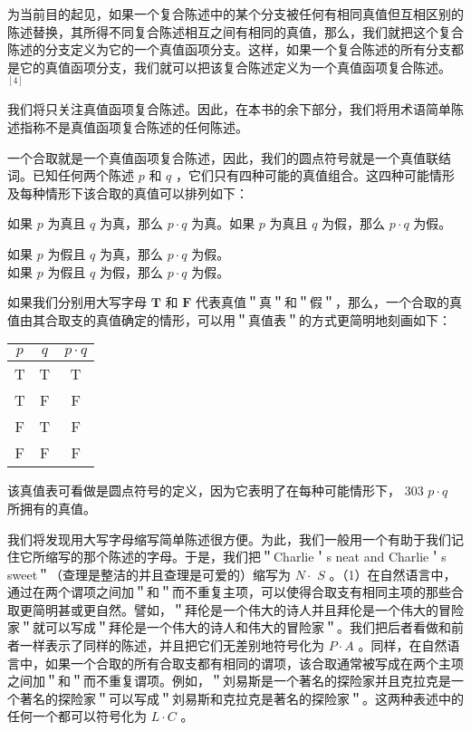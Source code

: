 为当前目的起见，如果一个复合陈述中的某个分支被任何有相同真值但互相区别的陈述替换，其所得不同复合陈述相互之间有相同的真值，那么，我们就把这个复合陈述的分支定义为它的一个真值函项分支。这样，如果一个复合陈述的所有分支都是它的真值函项分支，我们就可以把该复合陈述定义为一个真值函项复合陈述。 ${ }^{[4]}$

我们将只关注真值函项复合陈述。因此，在本书的余下部分，我们将用术语简单陈述指称不是真值函项复合陈述的任何陈述。

一个合取就是一个真值函项复合陈述，因此，我们的圆点符号就是一个真值联结词。已知任何两个陈述 $p$ 和 $q$ ，它们只有四种可能的真值组合。这四种可能情形及每种情形下该合取的真值可以排列如下：

如果 $p$ 为真且 $q$ 为真，那么 $p \cdot q$ 为真。如果 $p$ 为真且 $q$ 为假，那么 $p \cdot q$ 为假。

如果 $p$ 为假且 $q$ 为真，那么 $p \cdot q$ 为假。\\
如果 $p$ 为假且 $q$ 为假，那么 $p \cdot q$ 为假。

如果我们分别用大写字母 $\mathbf{T}$ 和 $\mathbf{F}$ 代表真值＂真＂和＂假＂，那么，一个合取的真值由其合取支的真值确定的情形，可以用＂真值表＂的方式更简明地刻画如下：

\begin{center}
\begin{tabular}{|ccc|}
\hline
$p$ & $q$ & $p \cdot q$ \\
\hline
T & T & T \\
T & F & F \\
F & T & F \\
F & F & F \\
\hline
\end{tabular}
\end{center}

该真值表可看做是圆点符号的定义，因为它表明了在每种可能情形下， 303 $p \cdot q$ 所拥有的真值。

我们将发现用大写字母缩写简单陈述很方便。为此，我们一般用一个有助于我们记住它所缩写的那个陈述的字母。于是，我们把＂Charlie＇s neat and Charlie＇s sweet＂（查理是整洁的并且查理是可爱的）缩写为 $N \cdot$ $S$ 。（1）在自然语言中，通过在两个谓项之间加＂和＂而不重复主项，可以使得合取支有相同主项的那些合取更简明甚或更自然。譬如，＂拜伦是一个伟大的诗人并且拜伦是一个伟大的冒险家＂就可以写成＂拜伦是一个伟大的诗人和伟大的冒险家＂。我们把后者看做和前者一样表示了同样的陈述，并且把它们无差别地符号化为 $P \cdot A$ 。同样，在自然语言中，如果一个合取的所有合取支都有相同的谓项，该合取通常被写成在两个主项之间加＂和＂而不重复谓项。例如，＂刘易斯是一个著名的探险家并且克拉克是一个著名的探险家＂可以写成＂刘易斯和克拉克是著名的探险家＂。这两种表述中的任何一个都可以符号化为 $L \cdot C$ 。

